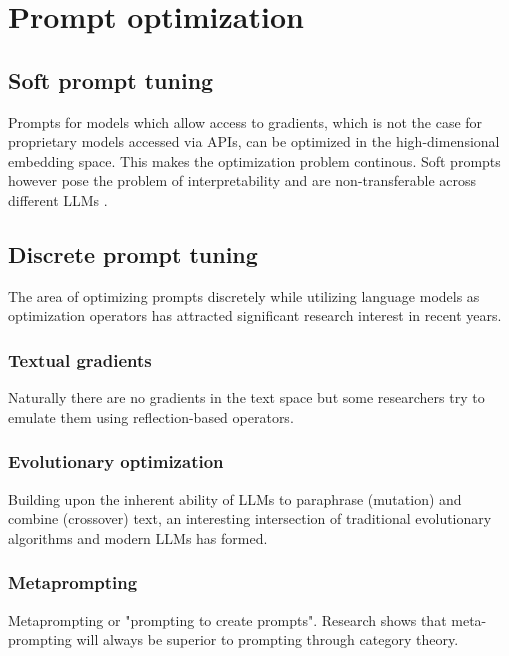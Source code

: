 \section{Prompt optimization}
\subsection{Soft prompt tuning}
Prompts for models which allow access to gradients, which is not the case for proprietary models accessed via APIs, can be optimized in the high-dimensional embedding space.
This makes the optimization problem continous. Soft prompts however pose the problem of interpretability and are non-transferable across different LLMs \cite{deng2022rlpromptoptimizingdiscretetext}.
\subsection{Discrete prompt tuning}
The area of optimizing prompts discretely while utilizing language models as optimization operators has attracted significant research interest in recent years.
\subsubsection{Textual gradients}
Naturally there are no gradients in the text space but some researchers try to emulate them using reflection-based operators.
\subsubsection{Evolutionary optimization}
Building upon the inherent ability of LLMs to paraphrase (mutation) and combine (crossover) text, an interesting intersection of traditional evolutionary algorithms and modern LLMs has formed. 
\subsubsection{Metaprompting}
Metaprompting or "prompting to create prompts". Research shows that meta-prompting will always be superior to prompting through category theory\cite{dewynter2024metaprompting}.